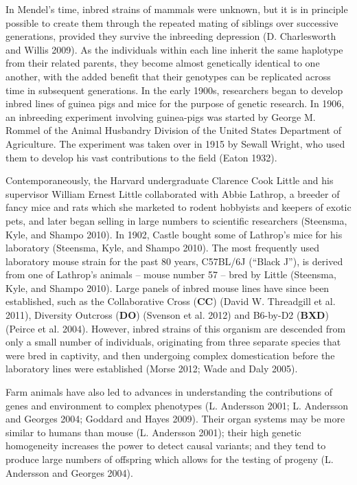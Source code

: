 \documentclass[
]{book}
\begin{document}
In Mendel's time, inbred strains of mammals were unknown, but it is in principle possible to create them through the repeated mating of siblings over successive generations, provided they survive the inbreeding depression (D. Charlesworth and Willis 2009). As the individuals within each line inherit the same haplotype from their related parents, they become almost genetically identical to one another, with the added benefit that their genotypes can be replicated across time in subsequent generations. In the early 1900s, researchers began to develop inbred lines of guinea pigs and mice for the purpose of genetic research. In 1906, an inbreeding experiment involving guinea-pigs was started by George M. Rommel of the Animal Husbandry Division of the United States Department of Agriculture. The experiment was taken over in 1915 by Sewall Wright, who used them to develop his vast contributions to the field (Eaton 1932).

Contemporaneously, the Harvard undergraduate Clarence Cook Little and his supervisor William Ernest Little collaborated with Abbie Lathrop, a breeder of fancy mice and rats which she marketed to rodent hobbyists and keepers of exotic pets, and later began selling in large numbers to scientific researchers (Steensma, Kyle, and Shampo 2010). In 1902, Castle bought some of Lathrop's mice for his laboratory (Steensma, Kyle, and Shampo 2010). The most frequently used laboratory mouse strain for the past 80 years, C57BL/6J (``Black J''), is derived from one of Lathrop's animals -- mouse number 57 -- bred by Little (Steensma, Kyle, and Shampo 2010). Large panels of inbred mouse lines have since been established, such as the Collaborative Cross (\textbf{CC}) (David W. Threadgill et al. 2011), Diversity Outcross (\textbf{DO}) (Svenson et al. 2012) and B6-by-D2 (\textbf{BXD}) (Peirce et al. 2004). However, inbred strains of this organism are descended from only a small number of individuals, originating from three separate species that were bred in captivity, and then undergoing complex domestication before the laboratory lines were established (Morse 2012; Wade and Daly 2005).

Farm animals have also led to advances in understanding the contributions of genes and environment to complex phenotypes (L. Andersson 2001; L. Andersson and Georges 2004; Goddard and Hayes 2009). Their organ systems may be more similar to humans than mouse (L. Andersson 2001); their high genetic homogeneity increases the power to detect causal variants; and they tend to produce large numbers of offspring which allows for the testing of progeny (L. Andersson and Georges 2004).
\end{document}
